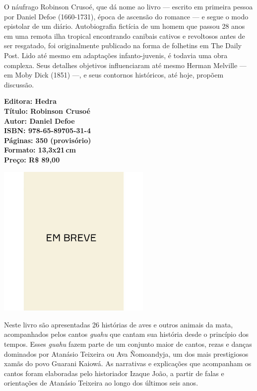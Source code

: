 \noindent{}O náufrago Robinson Crusoé, que dá nome ao livro — escrito em primeira pessoa por Daniel Defoe (1660-1731), época de ascensão do romance — e segue o modo epistolar de um diário. Autobiografia fictícia de um homem que passou 28 anos em uma remota ilha tropical encontrando canibais cativos e revoltosos antes de ser resgatado, foi originalmente publicado na forma de folhetins em The Daily Post. Lido até mesmo em adaptações infanto-juvenis, é todavia uma obra complexa. Seus detalhes objetivos influenciaram até mesmo Herman Melville  — em Moby Dick (1851) —, e seus contornos históricos, até hoje, propõem discussão.

\vfill
\noindent\begin{minipage}[c]{1\linewidth}
{\small\textbf{
\hspace*{-.1cm}Editora: Hedra\\
Título: Robinson Crusoé\\
Autor: Daniel Defoe\\ 
ISBN: 978-65-89705-31-4\\
Páginas: 350 (provisório)\\
Formato: 13,3x21\,cm\\
Preço: R\$ 89,00\\
}}
\end{minipage}
\pagebreak

\begin{center}
\hspace*{.5cm}\includegraphics[width=74mm]{./CAPAS/breve.jpeg}
\end{center}
\hspace*{-7cm}\hrulefill\hspace*{-7cm}
\medskip

\noindent{}Neste livro são apresentadas 26 histórias de aves e outros animais da mata, acompanhados pelos cantos \textit{guahu} que cantam sua história desde o princípio dos tempos. Esses \textit{guahu} fazem parte de um conjunto maior de cantos, rezas e danças dominados por Atanásio Teixeira ou Ava Ñomoandyja, um dos mais prestigiosos xamãs do povo Guarani Kaiowá. As narrativas e explicações que acompanham os cantos foram elaboradas pelo historiador Izaque João, a partir de falas e orientações de Atanásio Teixeira ao longo dos últimos seis anos. 

